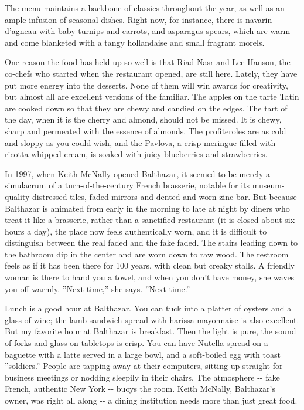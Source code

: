 The menu maintains a backbone of classics throughout the year, as well
as an ample infusion of seasonal dishes. Right now, for instance, there
is navarin d'agneau with baby turnips and carrots, and asparagus spears,
which are warm and come blanketed with a tangy hollandaise and small
fragrant morels.

One reason the food has held up so well is that Riad Nasr and Lee
Hanson, the co-chefs who started when the restaurant opened, are still
here. Lately, they have put more energy into the desserts. None of them
will win awards for creativity, but almost all are excellent versions of
the familiar. The apples on the tarte Tatin are cooked down so that they
are chewy and candied on the edges. The tart of the day, when it is the
cherry and almond, should not be missed. It is chewy, sharp and
permeated with the essence of almonds. The profiteroles are as cold and
sloppy as you could wish, and the Pavlova, a crisp meringue filled with
ricotta whipped cream, is soaked with juicy blueberries and
strawberries.

In 1997, when Keith McNally opened Balthazar, it seemed to be merely a
simulacrum of a turn-of-the-century French brasserie, notable for its
museum-quality distressed tiles, faded mirrors and dented and worn zinc
bar. But because Balthazar is animated from early in the morning to late
at night by diners who treat it like a brasserie, rather than a
sanctified restaurant (it is closed about six hours a day), the place
now feels authentically worn, and it is difficult to distinguish between
the real faded and the fake faded. The stairs leading down to the
bathroom dip in the center and are worn down to raw wood. The restroom
feels as if it has been there for 100 years, with clean but creaky
stalls. A friendly woman is there to hand you a towel, and when you
don't have money, she waves you off warmly. ''Next time,'' she says.
''Next time.''

Lunch is a good hour at Balthazar. You can tuck into a platter of
oysters and a glass of wine; the lamb sandwich spread with harissa
mayonnaise is also excellent. But my favorite hour at Balthazar is
breakfast. Then the light is pure, the sound of forks and glass on
tabletops is crisp. You can have Nutella spread on a baguette with a
latte served in a large bowl, and a soft-boiled egg with toast
''soldiers.'' People are tapping away at their computers, sitting up
straight for business meetings or nodding sleepily in their chairs. The
atmosphere -\/- fake French, authentic New York -\/- buoys the room.
Keith McNally, Balthazar's owner, was right all along -\/- a dining
institution needs more than just great food.

